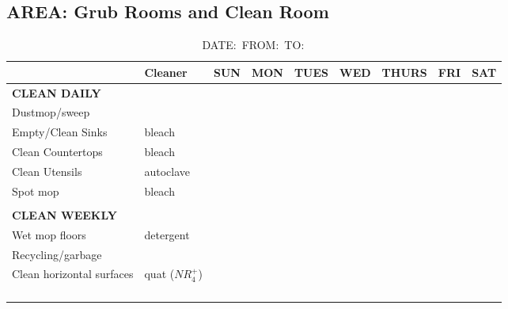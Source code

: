 \documentclass{sop_class}[overrideChapters] %
\begin{document}
{  \subsection{AREA: Grub Rooms and Clean Room}
\begin{table}[!htbp]
    \centering
    \setlength{\tabcolsep}{0.5em}
      \begin{threeparttable}
        \caption*{DATE$\colon$ \hfil  FROM$\colon$ \hfil TO$\colon$}
              \begin{tabular}{|l|l|c|c|c|c|c|c|c|}
            \hline
            {} & {Cleaner} & {SUN} & {MON} & {TUES} & {WED} & {THURS} & {FRI} & {SAT} \\
            \hline
            {\textbf{CLEAN DAILY}} & {} & {} & {} & {} & {} & {} & {} & {} \\
            \hline
            {Dustmop/sweep} & {} & {} & {} & {} & {} & {} & {} & {} \\
      \hline
      {Empty/Clean Sinks} & {bleach} & {} & {} & {} & {} & {} & {} & {} \\
        \hline
        {Clean Countertops} & {bleach} & {} & {} & {} & {} & {} & {} & {} \\
        \hline
        {Clean Utensils} & {autoclave} & {} & {} & {} & {} & {} & {} & {} \\
        \hline
        {Spot mop} & {bleach} & {} & {} & {} & {} & {} & {} & {} \\
        \hline
        {} & {} & {} & {} & {} & {} & {} & {} & {} \\
        \hline
        {\textbf{CLEAN WEEKLY}} & {} & {} & {} & {} & {} & {} & {} & {} \\
            \hline
            {Wet mop floors} & {detergent} & {} & {} & {} & {} & {} & {} & {} \\
        \hline
        {Recycling/garbage} & {} & {} & {} & {} & {} & {} & {} & {} \\
        \hline
        {Clean horizontal surfaces} & {quat ($NR_{4}^{+}$)} & {} & {} & {} & {} & {} & {} & {} \\
        \hline
        {} & {} & {} & {} & {} & {} & {} & {} & {} \\
        \hline
        {} & {} & {} & {} & {} & {} & {} & {} & {} \\
        \hline
        {} & {} & {} & {} & {} & {} & {} & {} & {} \\
        \hline
        {} & {} & {} & {} & {} & {} & {} & {} & {} \\

\end{tabular}
\end{threeparttable}
\end{table}}
\end{document}

